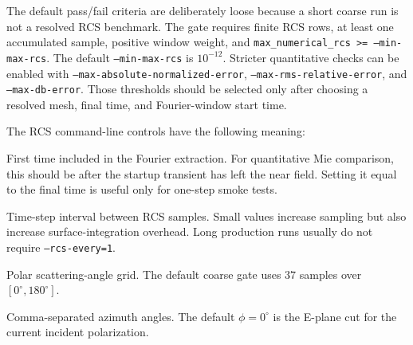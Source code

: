 \documentclass[11pt,oneside]{book}
\newcommand{\code}[1]{\texttt{#1}}
\begin{document}
The default pass/fail criteria are deliberately loose because a short coarse
run is not a resolved RCS benchmark. The gate requires finite RCS rows, at
least one accumulated sample, positive window weight, and
\code{max\_numerical\_rcs >= --min-max-rcs}. The default
\code{--min-max-rcs} is $10^{-12}$. Stricter quantitative checks can be enabled
with \code{--max-absolute-normalized-error},
\code{--max-rms-relative-error}, and \code{--max-db-error}. Those thresholds
should be selected only after choosing a resolved mesh, final time, and
Fourier-window start time.

The RCS command-line controls have the following meaning:
\begin{description}[style=nextline]
  \item[\code{--rcs-start-time}]
  First time included in the Fourier extraction. For quantitative Mie
  comparison, this should be after the startup transient has left the near
  field. Setting it equal to the final time is useful only for one-step smoke
  tests.

  \item[\code{--rcs-every}]
  Time-step interval between RCS samples. Small values increase sampling but
  also increase surface-integration overhead. Long production runs usually do
  not require \code{--rcs-every=1}.

  \item[\code{--rcs-theta-count},
        \code{--rcs-theta-min-degrees},
        \code{--rcs-theta-max-degrees}]
  Polar scattering-angle grid. The default coarse gate uses $37$ samples over
  $[0^\circ,180^\circ]$.

  \item[\code{--rcs-phi-degrees}]
  Comma-separated azimuth angles. The default $\phi=0^\circ$ is the E-plane
  cut for the current incident polarization.
\end{description}
\end{document}
